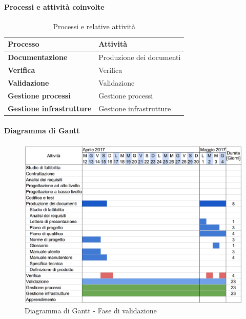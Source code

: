 		\paragraph{Processi e attività coinvolte}
			\begin{table}[H]
				\centering
				\begin{tabular}{ll}
					\toprule
					\textbf{Processo}                           & \textbf{Attività}              \\
					\midrule
					\textbf{Documentazione}            & Produzione dei documenti       \\
					\midrule
					\textbf{Verifica}                  & Verifica                       \\
					\midrule
					\textbf{Validazione}               & Validazione                    \\
					\midrule
					\textbf{Gestione processi} 					& Gestione processi              \\
					\midrule
					\textbf{Gestione infrastrutture}				& Gestione infrastrutture        \\
					\bottomrule
				\end{tabular}
				\caption{Processi e relative attività}
				\label{Va-ProcessiAttività}
			\end{table}
		\paragraph{Diagramma di Gantt}
		\begin{figure}[H]
			\centering
			\includegraphics[width=\textwidth]{img/Gantt/f6c.png}
			\caption{Diagramma di Gantt - Fase di validazione}
		\end{figure}
